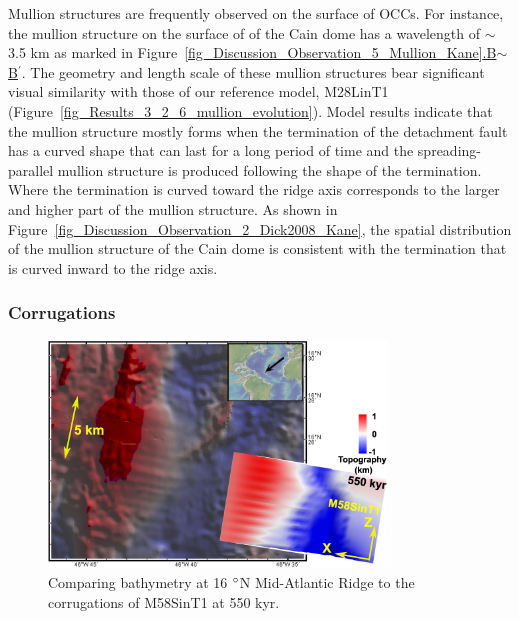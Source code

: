 Mullion structures are frequently observed on the surface of OCCs. For instance, the mullion structure on the surface of of the Cain dome has a wavelength of $\sim$3.5 km as marked in Figure~\hyperref[fig_Discussion_Observation_5_Mullion_Kane]{\ref{fig_Discussion_Observation_5_Mullion_Kane}.B$\sim$B$^\prime$}. The geometry and length scale of these mullion structures bear significant visual similarity with those of our reference model, M28LinT1 (Figure~\hyperref[fig_Results_3_2_6_mullion_evolution]{\ref{fig_Results_3_2_6_mullion_evolution}}). Model results indicate that the mullion structure mostly forms when the termination of the detachment fault has a curved shape that can last for a long period of time and the spreading-parallel mullion structure is produced following the shape of the termination. Where the termination is curved toward the ridge axis corresponds to the larger and higher part of the mullion structure. As shown in Figure~\hyperref[fig_Discussion_Observation_2_Dick2008_Kane]{\ref{fig_Discussion_Observation_2_Dick2008_Kane}}, the spatial distribution of the mullion structure of the Cain dome is consistent with the termination that is curved inward to the ridge axis.

\subsubsection{Corrugations}

\begin{figure}[h]
  \centering
    \includegraphics[width=0.8\textwidth]{./Figures/TOBE_USED_fig_Discussion_Observation_Corrugations_16N_MAR.eps}
  \caption{Comparing bathymetry at 16 $\degree$N Mid-Atlantic Ridge to the corrugations of M58SinT1 at 550 kyr.}
 \label{fig_Discussion_Observation_Corrugations16N_M58SinT1}
\end{figure}

